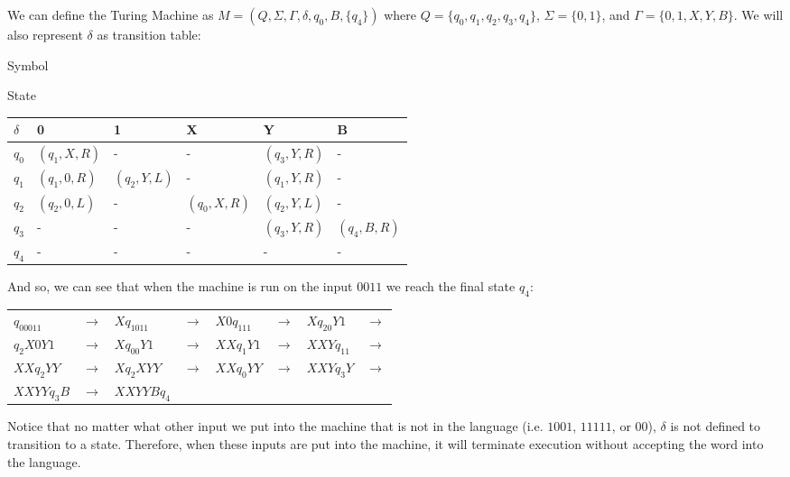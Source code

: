 \documentclass[11pt]{article}
\begin{document}
We can define the Turing Machine as $M=(Q,\Sigma, \Gamma, \delta, q_0, B, \{q_4\})$ where $Q = \{q_0, q_1, q_2, q_3, q_4 \}$, $\Sigma = \{0,1\}$, and $\Gamma = \{0,1,X,Y,B\}$. We will also represent $\delta$ as transition table:

\begin{center}
Symbol

State
\begin{tabular}{ l | l   l   l   l   l }

$\delta$	& 0				& 1				& X				& Y				& B			\\ \hline
$q_0$ 	& $(q_1,X,R)$		& -				& -				& $(q_3,Y,R)$		& -			\\ 
$q_1$	& $(q_1,0,R)$		& $(q_2,Y,L)$		& -				& $(q_1,Y,R)$		& -			\\
$q_2$	& $(q_2,0,L)$		& -				&$ (q_0,X,R) $		& $(q_2,Y,L)$		& -			\\
$q_3$	& -				& -				& -				& $(q_3,Y,R)$		& $(q_4,B,R) $	\\
$q_4$	& -				& -				& -				& -				& -			\\ 
    
\end{tabular}
\end{center}

And so, we can see that when the machine is run on the input $0011$ we reach the final state $q_4$:

\begin{center}
\begin{tabular}{l l l l l l l l}

$q_00011$	& $\to$	& $Xq_1011$		&$\to$	& $X0q_111$		& $\to$	& $Xq_20Y1$		&$\to$	\\
$q_2X0Y1$	& $\to$	& $Xq_00Y1$		&$\to$	& $XXq_1Y1$		& $\to$	& $ XXYq_11$		&$\to$	\\
$XXq_2YY$	& $\to$	& $Xq_2XYY$		&$\to$	& $XXq_0YY$		& $\to$	& $ XXYq_3Y$		&$\to$	\\
$XXYYq_3B$	& $\to$	& $XXYYBq_4$	&		&				&		&				&		\\

    
\end{tabular}
\end{center}

\noindent Notice that no matter what other input we put into the machine that is not in the language (i.e. $1001$, $11111$, or $00$), $\delta$ is not defined to transition to a state. Therefore, when these inputs are put into the machine, it will terminate execution without accepting the word into the language.
\end{document}
